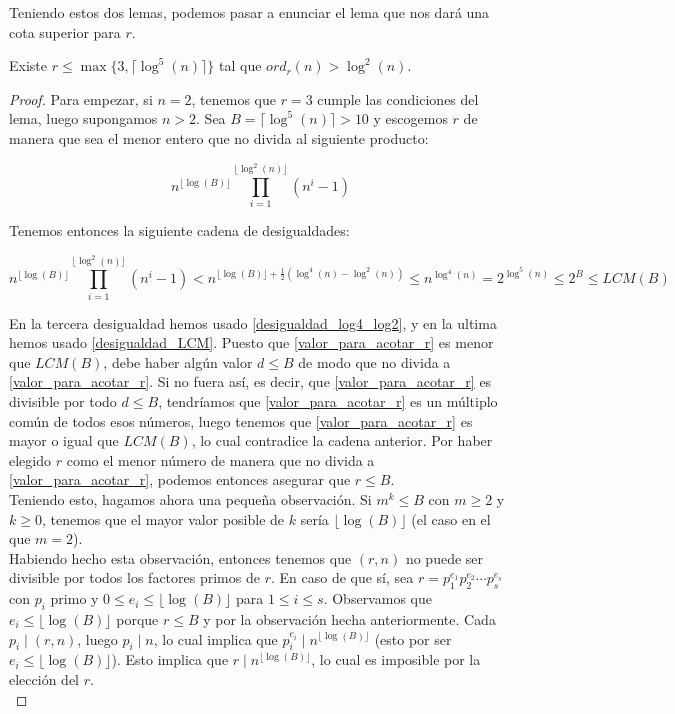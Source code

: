 Teniendo estos dos lemas, podemos pasar a enunciar el lema que nos dará una cota superior para $r$.

\begin{lema}\label{cota_superior_r_log5}
	Existe $r \leq \max\{3, \lceil \log^5(n) \rceil \}$ tal que $ord_r(n) > \log^2(n)$.
\end{lema}

\begin{proof}
	Para empezar, si $n = 2$, tenemos que $r = 3$ cumple las condiciones del lema, luego supongamos $n > 2$. Sea $B = \lceil \log^5(n) \rceil > 10$ y escogemos $r$ de manera que sea el menor entero que no divida al siguiente producto:
		
	\begin{equation}\label{valor_para_acotar_r}
	n^{\lfloor \log(B) \rfloor}\prod_{i=1}^{\lfloor \log^2(n) \rfloor}(n^i - 1)
	\end{equation}
	
	Tenemos entonces la siguiente cadena de desigualdades:
	
	\[ n^{\lfloor \log(B) \rfloor}\prod_{i=1}^{\lfloor \log^2(n) \rfloor}(n^i - 1) < n^{\lfloor \log(B) \rfloor + \frac{1}{2}(\log^4(n) - \log^2(n))} \leq n^{\log^4(n)} = 2^{\log^5(n)} \leq 2^B \leq LCM(B) \]
	
	En la tercera desigualdad hemos usado \autoref{desigualdad_log4_log2}, y en la ultima hemos usado \autoref{desigualdad_LCM}. Puesto que \eqref{valor_para_acotar_r} es menor que $LCM(B)$, debe haber algún valor $d \leq B$ de modo que no divida a \eqref{valor_para_acotar_r}. Si no fuera así, es decir, que \eqref{valor_para_acotar_r} es divisible por todo $d \leq B$, tendríamos que \eqref{valor_para_acotar_r} es un múltiplo común de todos esos números, luego tenemos que \eqref{valor_para_acotar_r} es mayor o igual que $LCM(B)$, lo cual contradice la cadena anterior. Por haber elegido $r$ como el menor número de manera que no divida a \eqref{valor_para_acotar_r}, podemos entonces asegurar que $r \leq B$.\\
	
	Teniendo esto, hagamos ahora una pequeña observación. Si $m^k \leq B$ con $m \geq 2$ y $k \geq 0$, tenemos que el mayor valor posible de $k$ sería $\lfloor \log(B) \rfloor$ (el caso en el que $m = 2$).\\
	
	Habiendo hecho esta observación, entonces tenemos que $(r, n)$ no puede ser divisible por todos los factores primos de $r$. En caso de que sí, sea $r = p_1^{e_1}p_2^{e_2}\dotsm p_s^{e_s}$ con $p_i$ primo y $0 \leq e_i \leq \lfloor \log(B) \rfloor$ para $1 \leq i \leq s$. Observamos que $e_i \leq \lfloor \log(B) \rfloor$ porque $r \leq B$ y por la observación hecha anteriormente. Cada $p_i \mid (r, n)$, luego $p_i \mid n$, lo cual implica que $p_i^{e_i} \mid n^{\lfloor \log(B) \rfloor}$ (esto por ser $e_i \leq \lfloor \log(B) \rfloor$). Esto implica que $r \mid n^{\lfloor \log(B) \rfloor}$, lo cual es imposible por la elección del $r$.\\
	

\end{proof}

